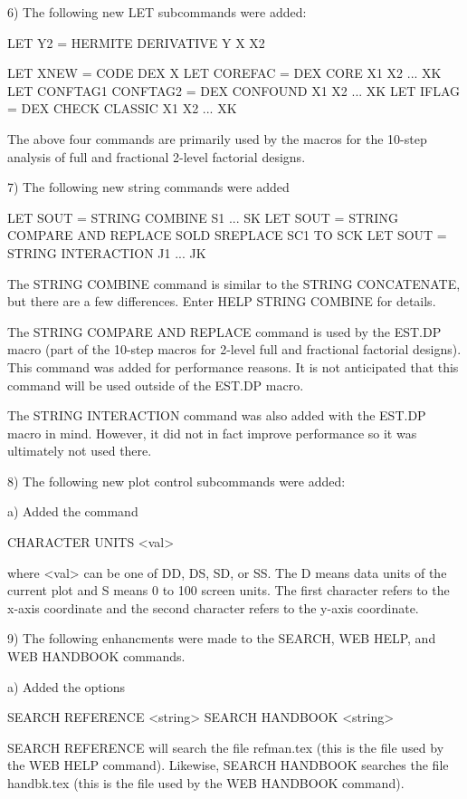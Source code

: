  6) The following new LET subcommands were added:

       LET Y2 = HERMITE DERIVATIVE Y X X2

       LET XNEW = CODE DEX X
       LET COREFAC = DEX CORE X1 X2 ... XK
       LET CONFTAG1 CONFTAG2 = DEX CONFOUND X1 X2 ... XK
       LET IFLAG = DEX CHECK CLASSIC X1 X2 ... XK

    The above four commands are primarily used by the macros for the
    10-step analysis of full and fractional 2-level factorial designs.

 7) The following new string commands were added

       LET SOUT = STRING COMBINE S1 ... SK
       LET SOUT = STRING COMPARE AND REPLACE SOLD SREPLACE SC1 TO SCK
       LET SOUT = STRING INTERACTION J1 ... JK

    The STRING COMBINE command is similar to the STRING CONCATENATE, but
    there are a few differences.  Enter HELP STRING COMBINE for details.

    The STRING COMPARE AND REPLACE command is used by the EST.DP macro
    (part of the 10-step macros for 2-level full and fractional factorial
    designs).  This command was added for performance reasons.  It is not
    anticipated that this command will be used outside of the EST.DP macro.

    The STRING INTERACTION command was also added with the EST.DP macro
    in mind.  However, it did not in fact improve performance so it was
    ultimately not used there.

 8) The following new plot control subcommands were added:

    a) Added the command

         CHARACTER UNITS <val> 

       where <val> can be one of DD, DS, SD, or SS.  The D means data
       units of the current plot and S means 0 to 100 screen units.
       The first character refers to the x-axis coordinate and the
       second character refers to the y-axis coordinate.

 9) The following enhancments were made to the SEARCH, WEB HELP,
    and WEB HANDBOOK commands.

    a) Added the options

         SEARCH REFERENCE <string>
         SEARCH HANDBOOK  <string>

       SEARCH REFERENCE will search the file refman.tex (this is the
       file used by the WEB HELP command).  Likewise, SEARCH HANDBOOK
       searches the file handbk.tex (this is the file used by the
       WEB HANDBOOK command).

